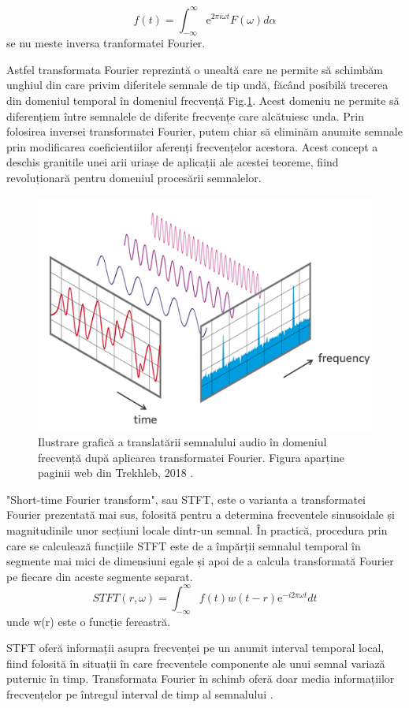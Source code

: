 \documentclass[a4paper,12pt]{book}
\begin{document}
			\begin{equation*}
				f(t) = \int_{-\infty}^{\infty}  \mathrm{e}^{2\pi i\omega t} F(\omega) d\alpha
			\end{equation*}
			se nu meste inversa tranformatei Fourier. \par
			Astfel transformata Fourier reprezintă o unealtă care ne permite să schimbăm unghiul din care privim diferitele semnale de tip undă, făcând posibilă trecerea din domeniul temporal în domeniul frecvență Fig.\ref{fig:tf}. Acest domeniu ne permite să diferențiem între semnalele de diferite frecvențe care alcătuiesc unda. Prin folosirea inversei transformatei Fourier, putem chiar să eliminăm anumite semnale prin modificarea coeficientiilor aferenți frecvențelor acestora. Acest concept a deschis granitile unei arii uriașe de aplicații ale acestei teoreme, fiind revoluționară pentru domeniul procesării semnalelor.  	
				\begin{figure}[h]
					\centering
					\includegraphics[scale=0.50]{ft}
					\caption{Ilustrare grafică a translatării semnalului audio în domeniul frecvență după aplicarea transformatei Fourier. Figura aparține paginii web din Trekhleb, 2018 \cite{stft6}.}
					\label{fig:tf}
				\end{figure}		
				
			"Short-time Fourier transform", sau STFT, este o varianta a transformatei Fourier prezentată mai sus, folosită pentru a determina frecventele sinusoidale și magnitudinile unor secțiuni locale dintr-un semnal. În practică, procedura prin care se calculează funcțiile STFT este de a împărții semnalul temporal în segmente mai mici de dimensiuni egale și apoi de a calcula transformată Fourier pe fiecare din aceste segmente separat. 
			\begin{equation*}
			STFT(r , \omega) = \int_{-\infty}^{\infty}  f(t) w(t-r)\mathrm{e}^{- i 2\pi \omega t}  dt
			\end{equation*}
			unde w(r) este o funcție fereastră. \par
			STFT oferă informații asupra frecvenței pe un anumit interval temporal local, fiind folosită în situații în care frecventele componente ale unui semnal variază puternic în timp. Transformata Fourier în schimb oferă doar media informațiilor frecvențelor pe întregul interval de timp al semnalului \cite{stft2}.
			
\end{document}
